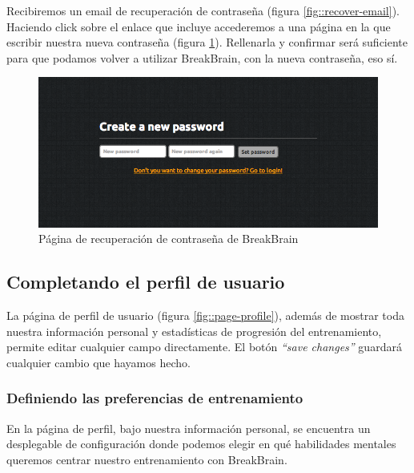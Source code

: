 Recibiremos un email de recuperación de contraseña (figura \ref{fig::recover-email}). Haciendo click sobre el enlace que incluye accederemos a una página en la que escribir nuestra nueva contraseña (figura \ref{fig::recover-pass}). Rellenarla y confirmar será suficiente para que podamos volver a utilizar BreakBrain, con la nueva contraseña, eso sí.

\begin{figure}[h]
  \begin{center}
    \includegraphics[width=\textwidth]{./images/page-password.png}
  \end{center}  
  \caption{Página de recuperación de contraseña de BreakBrain}
  \label{fig::recover-pass}
\end{figure}

\subsection{Completando el perfil de usuario}

La página de perfil de usuario (figura \ref{fig::page-profile}), además de mostrar toda nuestra información personal y estadísticas de progresión del entrenamiento, permite editar cualquier campo directamente. El botón {\it ``save changes''} guardará cualquier cambio que hayamos hecho.

\subsubsection{Definiendo las preferencias de entrenamiento}

En la página de perfil, bajo nuestra información personal, se encuentra un desplegable de configuración donde podemos elegir en qué habilidades mentales queremos centrar nuestro entrenamiento con BreakBrain.

